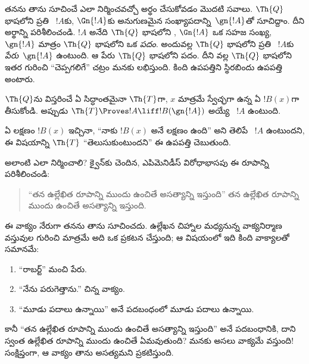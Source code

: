 \documentclass[../../../include/open-logic-section]{subfiles}
\begin{document}
తనను తాను సూచించే  ఎలా నిర్మించవచ్చో అర్థం చేసుకోవడం మొదటి
సవాలు. $\Th{Q}$ భాషలోని ప్రతి ~$!A$కు, $\Gn{!A}$కు
అనుగుణమైన సంఖ్యాపదాన్ని~$\gn{!A}$తో సూచిద్దాం. దీని అర్థాన్ని
పరిశీలించండి. $!A$ అనేది $\Th{Q}$ భాషలోని , $\Gn{!A}$ ఒక సహజ
సంఖ్య, $\gn{!A}$ మాత్రం $\Th{Q}$ భాషలోని ఒక \emph{పదం}. అందువల్ల
$\Th{Q}$ భాషలోని ప్రతి ~$!A$కు \emph{పేరు}~$\gn{!A}$ ఉంటుంది.
ఆ పేరు $\Th{Q}$ భాషలోని పదం. దీని వల్ల $\Th{Q}$ భాషలోని
 ఇతర  గురించి ``చెప్పగలిగే'' చట్రం
మనకు లభిస్తుంది. కింది ఉపపత్తిని స్థిరబిందు ఉపపత్తి అంటారు.

\begin{lem}
$\Th{Q}$ను విస్తరించే ఏ సిద్ధాంతమైనా $\Th{T}$గా, $x$ మాత్రమే స్వేచ్ఛగా ఉన్న
ఏ  $!B(x)$గా తీసుకోండి. అప్పుడు $\Th{T} \Proves!A \liff
!B(\gn{!A})$ అయ్యే ~$!A$ ఉంటుంది.
\end{lem}

ఏ లక్షణం $!B(x)$ ఇచ్చినా, ``నాకు $!B(x)$ అనే లక్షణం ఉంది'' అని తెలిపే
~$!A$ ఉంటుందని, ఈ విషయాన్ని $\Th{T}$ ``తెలుసుకుంటుందని'' ఈ
ఉపపత్తి చెబుతుంది.

అలాంటి  ఎలా నిర్మించాలి? క్వైన్‌కు చెందిన, ఎపిమెనిడీస్
విరోధాభాసపు ఈ రూపాన్ని పరిశీలించండి:
\begin{quote}
``తన ఉల్లేఖిత రూపాన్ని ముందు ఉంచితే అసత్యాన్ని ఇస్తుంది'' తన ఉల్లేఖిత రూపాన్ని
ముందు ఉంచితే అసత్యాన్ని ఇస్తుంది.
\end{quote}
ఈ వాక్యం నేరుగా తనను తాను సూచించదు. ఉల్లేఖన చిహ్నాల మధ్యనున్న వాక్యనిర్మాణ
వస్తువుల గురించి మాత్రమే అది ఒక ప్రకటన చేస్తుంది; ఆ విషయంలో ఇది కింది
వాక్యాలతో సమానమే:
\begin{enumerate}
\item ``రాబర్ట్'' మంచి పేరు.
\item ``నేను పరుగెత్తాను.'' చిన్న వాక్యం.
\item ``మూడు పదాలు ఉన్నాయి'' అనే పదబంధంలో మూడు పదాలు ఉన్నాయి.
\end{enumerate}
కానీ ``తన ఉల్లేఖిత రూపాన్ని ముందు ఉంచితే అసత్యాన్ని ఇస్తుంది'' అనే పదబంధానికి,
దాని స్వంత ఉల్లేఖిత రూపాన్ని ముందు ఉంచితే ఏమవుతుంది? మనకు అసలు వాక్యమే
వస్తుంది!{} సంక్షిప్తంగా, ఆ వాక్యం తాను అసత్యమని ప్రకటిస్తుంది.
\end{document}
